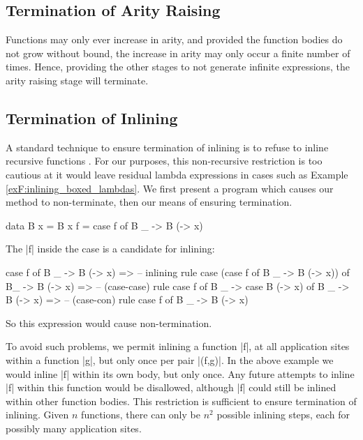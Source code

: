 \subsection{Termination of Arity Raising}

Functions may only ever increase in arity, and provided the function bodies do not grow without bound, the increase in arity may only occur a finite number of times. Hence, providing the other stages to not generate infinite expressions, the arity raising stage will terminate.

\subsection{Termination of Inlining}

A standard technique to ensure termination of inlining is to refuse to inline recursive functions \cite{spj:inlining}. For our purposes, this non-recursive restriction is too cautious at it would leave residual lambda expressions in cases such as Example \ref{exF:inlining_boxed_lambdas}. We first present a program which causes our method to non-terminate, then our means of ensuring termination.

\begin{example}
\begin{code}
data B x = B x
f = case  f of
          B _ -> B (\x -> x)
\end{code}

The |f| inside the case is a candidate for inlining:

\ignore\begin{code}
case f of B _ -> B (\x -> x)
    => -- inlining rule
case (case f of B _ -> B (\x -> x)) of B_ -> B (\x -> x)
    => -- (case-case) rule
case f of B _ -> case B (\x -> x) of B _ -> B (\x -> x)
    => -- (case-con) rule
case f of B _ -> B (\x -> x)
\end{code}

\noindent So this expression would cause non-termination.
\end{example}

To avoid such problems, we permit inlining a function |f|, at all application sites within a function |g|, but only once per pair |(f,g)|. In the above example we would inline |f| within its own body, but only once. Any future attempts to inline |f| within this function would be disallowed, although |f| could still be inlined within other function bodies. This restriction is sufficient to ensure termination of inlining. Given $n$ functions, there can only be $n^2$ possible inlining steps, each for possibly many application sites.


